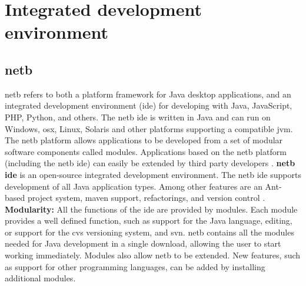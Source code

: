\section{Integrated development environment}

\subsection{\gls{netb}}
\gls{netb} refers to both a platform framework for Java desktop applications, and an integrated development environment (\gls{ide}) for developing with Java, JavaScript, PHP, Python, and others.
The \gls{netb} \gls{ide} is written in Java and can run on Windows, \gls{osx}, Linux, Solaris and other platforms supporting a compatible \gls{jvm}. 
\newline
\newline
The \gls{netb} platform allows applications to be developed from a set of modular software components called modules. Applications based on the \gls{netb} platform (including the \gls{netb} \gls{ide}) can easily be extended by third party developers \cite{bib:netbeans}.
\newline
\newline
\textbf{\gls{netb} \gls{ide}} is an open-source integrated development environment. The \gls{netb} \gls{ide} supports development of all Java application types. Among other features are an Ant-based project system, \gls{maven} support, refactorings, and version control \cite{bib:ide}.
\newline
\newline
\textbf{Modularity:} All the functions of the \gls{ide} are provided by modules. Each module provides a well defined function, such as support for the Java language, editing, or support for the \gls{cvs} versioning system, and \gls{svn}. \gls{netb} contains all the modules needed for Java development in a single download, allowing the user to start working immediately. Modules also allow \gls{netb} to be extended. New features, such as support for other programming languages, can be added by installing additional modules.